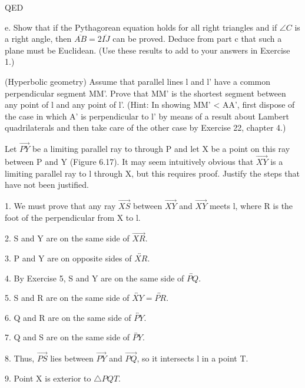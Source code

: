 \documentclass[12pt,letterpaper]{article}
\newcommand{\QED}{\begin{flushright}QED\end{flushright}}
\newcommand{\prob}[1]{\newpage\noindent {\bf #1}}
\begin{document}
\QED







\newpage 

e. Show that if the Pythagorean equation holds for all right triangles and if $\angle C$ is a right angle, then $\overline{AB} = 2\overline{IJ}$ can be proved.  Deduce from part c that such a plane must be Euclidean.  (Use these results to add to your answers in Exercise 1.)







\prob{3 }(Hyperbolic geometry)
Assume that parallel lines l and l' have a common perpendicular segment MM'.  Prove that MM'  is the shortest segment between any point of l and any point of l'.  (Hint: In showing MM' < AA', first dispose of the case in which A' is perpendicular to l' by means of a result about Lambert quadrilaterals and then take care of the other case by Exercise 22, chapter 4.)




\prob{6 }Let $\overrightarrow{PY}$ be a limiting parallel ray to  through P and let X be a point on this ray between P and Y (Figure 6.17).  It may seem intuitively obvious that $\overrightarrow{XY}$ is a limiting parallel ray to l through X, but this requires proof.  Justify the steps that have not been justified. 

1. We must prove that any ray $\overrightarrow{XS}$ between $\overrightarrow{XY}$ and $\overrightarrow{XY}$ meets l, where R is the foot of the perpendicular from X to l. 

2. S and Y are on the same side of $\overrightarrow{XR}$.  

3. P and Y are on opposite sides of $\overleftrightarrow{XR}$. 

4. By Exercise 5, S and Y are on the same side of $\overleftrightarrow{PQ}$.  

5. S and R are on the same side of $\overleftrightarrow{XY} = \overleftrightarrow{PR}.$

6. Q and R are on the same side of $\overleftrightarrow{PY}$.

7. Q and S are on the same side of $\overleftrightarrow{PY}$.

8. Thus, $\overrightarrow{PS}$ lies between $\overrightarrow{PY} $ and $\overrightarrow{PQ}$, so it intersects l in a point T.  

9. Point X is exterior to $\triangle PQT$.  
\end{document}
